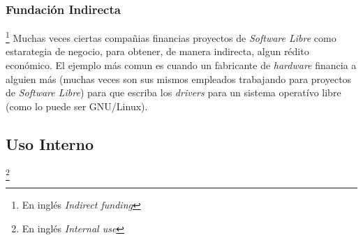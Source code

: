 \subsubsection{Fundaci\'on Indirecta}\footnote{En ingl\'es \emph{Indirect
funding}}
%
Muchas veces ciertas compa\~nias financias proyectos de \emph{Software Libre}
como estarategia de negocio, para obtener, de manera indirecta, algun r\'edito
econ\'omico. El ejemplo m\'as comun es cuando un fabricante de \emph{hardware}
financia a alguien m\'as (muchas veces son sus mismos empleados trabajando
para proyectos de \emph{Software Libre}) para que escriba los \emph{drivers}
para un sistema operat\'ivo libre (como lo puede ser GNU/Linux). 

\subsection{Uso Interno}\footnote{En ingl\'es \emph{Internal use}}
%





